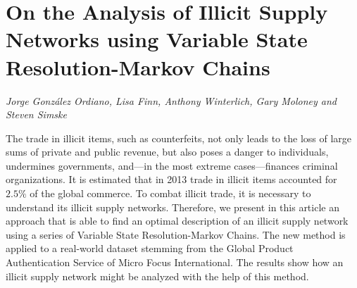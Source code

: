 \documentclass[../booklet.tex]{subfiles}
\begin{document}
\section[On the Analysis of Illicit Supply Networks using Variable State Resolution-Markov Chains. {\it Jorge González Ordiano, Lisa Finn, Anthony Winterlich, Gary Moloney and Steven Simske}]{On the Analysis of Illicit Supply Networks using Variable State Resolution-Markov Chains}
    

\begin{center}
  {\it Jorge González Ordiano, Lisa Finn, Anthony Winterlich, Gary Moloney and Steven Simske}
\end{center}

\vskip 0.8cm


The trade in illicit items, such as counterfeits, not only leads to the loss of large sums of private and public revenue, but also poses a danger to individuals, undermines governments, and---in the most extreme cases---finances criminal organizations. It is estimated that in 2013 trade in illicit items accounted for $2.5\%$ of the global commerce. To combat illicit trade, it is necessary to understand its illicit supply networks. Therefore, we present in this article an approach that is able to find an optimal description of an illicit supply network using a series of Variable State Resolution-Markov Chains. The new method is applied to a real-world dataset stemming from the Global Product Authentication Service of Micro Focus International. The results show how an illicit supply network might be analyzed with the help of this method.

\end{document}
